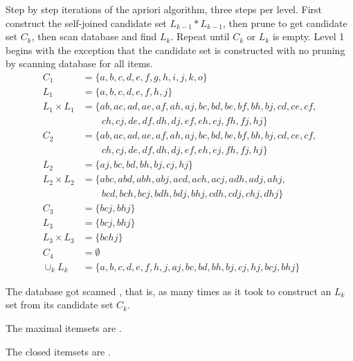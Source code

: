 \documentclass[newpage]{homework}
\begin{document}
\maketitle

\question
\begin{alphaparts}

\questionpart
Step by step iterations of the apriori algorithm, three steps per level. First construct the self-joined candidate set $L_{k-1} * L_{k-1}$, then prune to get candidate set $C_k$, then scan database and find $L_k$. Repeat until $C_k$ or $L_k$ is empty. Level 1 begins with the exception that the candidate set is constructed with no pruning by scanning database for all items.
\begin{align*}
    C_1	&=	\{ a, b, c, d, e, f, g, h, i, j, k, o \}	\\
    L_1	&=	\{ a, b, c, d, e, f, h, j \}	\\
    L_1 \times L_1	&=	\{ ab, ac, ad, ae, af, ah, aj, bc, bd, be, bf, bh, bj, cd, ce, cf, \\
                &\quad\quad ch, cj, de, df, dh, dj, ef, eh, ej, fh, fj, hj \}	\\
    C_2         &=	\{ ab, ac, ad, ae, af, ah, aj, bc, bd, be, bf, bh, bj, cd, ce, cf, \\
                &\quad\quad ch, cj, de, df, dh, dj, ef, eh, ej, fh, fj, hj \}	\\
    L_2    &=	\{ aj, bc, bd, bh, bj, cj, hj\}	\\
    L_2 \times L_2   &=  \{ abc, abd, abh, abj, acd, ach, acj, adh, adj, ahj, \\
                &\quad\quad bcd, bch, bcj, bdh, bdj, bhj, cdh, cdj, chj, dhj \} \\
    C_3 &=  \{ bcj, bhj \} \\
    L_3    &=	\{ bcj, bhj \}	\\
    L_3 \times L_3   &=  \{ bchj \}   \\
    C_4 &=  \emptyset   \\
    \cup_k L_k &=   \boxed{\{a, b, c, d, e, f, h, j, aj, bc, bd, bh, bj, cj, hj, bcj, bhj\}}
\end{align*}

\questionpart
The database got scanned , that is, as many times as it took to construct an $L_k$ set from its candidate set $C_k$.

\questionpart
The maximal itemsets are .

The closed itemsets are .


\end{alphaparts}
\end{document}

